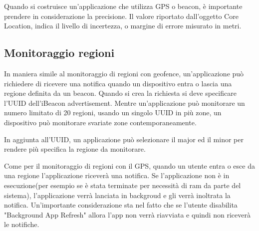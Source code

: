 Quando si costruisce un'applicazione che utilizza GPS o beacon, è importante prendere in considerazione la precisione.
Il valore riportato dall'oggetto Core Location, indica il livello di incertezza, o margine di errore misurato in metri. 

\subsection{Monitoraggio regioni}
In maniera simile al monitoraggio di regioni con geofence, un'applicazione può richiedere di ricevere una notifica quando un dispositivo entra o lascia una regione definita da un beacon. 
Quando si crea la richiesta si deve specificare l'UUID dell'iBeacon advertisement. Mentre un'applicazione può monitorare un numero limitato di 20 regioni, usando un singolo UUID in più zone, un dispositivo può monitorare svariate zone contemporaneamente.

In aggiunta all'UUID, un applicazione può selezionare il major ed il minor per rendere più specifica la regione da monitorare.

Come per il monitoraggio di regioni con il GPS, quando un utente entra o esce da una regione l'applicazione riceverà una notifica. 
Se l'applicazione non è in esecuzione(per esempio se è stata terminate per necessità di ram da parte del sistema), l'applicazione verrà lanciata in backgroud e gli verrà inoltrata la notifica. 
Un'importante considerazione sta nel fatto che se l'utente disabilita "Background App Refresh" allora l'app non verrà riavviata e quindi non riceverà le notifiche.

